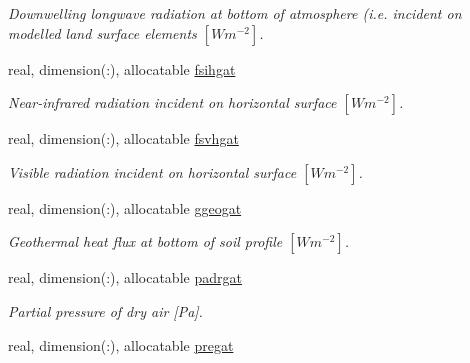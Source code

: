 \begin{DoxyCompactItemize}
\begin{DoxyCompactList}\small\item\em Downwelling longwave radiation at bottom of atmosphere (i.\+e. incident on modelled land surface elements $[W m^{-2} ]$. \end{DoxyCompactList}\item 
\hypertarget{structclass__statevars_1_1class__gather_a6b5f9ac8e0ec639df4c7eb5dafa97537}{}real, dimension(\+:), allocatable \hyperlink{structclass__statevars_1_1class__gather_a6b5f9ac8e0ec639df4c7eb5dafa97537}{fsihgat}\label{structclass__statevars_1_1class__gather_a6b5f9ac8e0ec639df4c7eb5dafa97537}

\begin{DoxyCompactList}\small\item\em Near-\/infrared radiation incident on horizontal surface $[W m^{-2} ]$. \end{DoxyCompactList}\item 
\hypertarget{structclass__statevars_1_1class__gather_aebc5d37d04d83b70662b2a24c94989b4}{}real, dimension(\+:), allocatable \hyperlink{structclass__statevars_1_1class__gather_aebc5d37d04d83b70662b2a24c94989b4}{fsvhgat}\label{structclass__statevars_1_1class__gather_aebc5d37d04d83b70662b2a24c94989b4}

\begin{DoxyCompactList}\small\item\em Visible radiation incident on horizontal surface $[W m^{-2} ]$. \end{DoxyCompactList}\item 
\hypertarget{structclass__statevars_1_1class__gather_a6a3bef597bd48de38ac1802bb2c923ca}{}real, dimension(\+:), allocatable \hyperlink{structclass__statevars_1_1class__gather_a6a3bef597bd48de38ac1802bb2c923ca}{ggeogat}\label{structclass__statevars_1_1class__gather_a6a3bef597bd48de38ac1802bb2c923ca}

\begin{DoxyCompactList}\small\item\em Geothermal heat flux at bottom of soil profile $[W m^{-2} ]$. \end{DoxyCompactList}\item 
\hypertarget{structclass__statevars_1_1class__gather_ab9b78e81142044d7e9207624a86d6acd}{}real, dimension(\+:), allocatable \hyperlink{structclass__statevars_1_1class__gather_ab9b78e81142044d7e9207624a86d6acd}{padrgat}\label{structclass__statevars_1_1class__gather_ab9b78e81142044d7e9207624a86d6acd}

\begin{DoxyCompactList}\small\item\em Partial pressure of dry air \mbox{[}Pa\mbox{]}. \end{DoxyCompactList}\item 
\hypertarget{structclass__statevars_1_1class__gather_a903ac00d7224fbe213d97d0cb14bb207}{}real, dimension(\+:), allocatable \hyperlink{structclass__statevars_1_1class__gather_a903ac00d7224fbe213d97d0cb14bb207}{pregat}\label{structclass__statevars_1_1class__gather_a903ac00d7224fbe213d97d0cb14bb207}


\end{DoxyCompactItemize}
